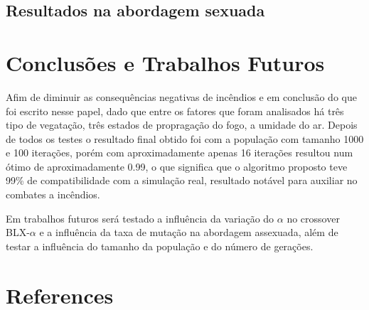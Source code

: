\documentclass[12pt]{article}
\begin{document}
\subsection{Resultados na abordagem sexuada}

\section{Conclusões e Trabalhos Futuros}
Afim de diminuir as consequências negativas de incêndios e em conclusão do que foi escrito nesse papel, dado que entre os fatores que foram analisados há três tipo de vegatação, três estados de propragação do fogo, a umidade do ar.
Depois de todos os testes o resultado final obtido foi com a população com tamanho 1000 e 100 iterações, porém com aproximadamente apenas 16 iterações resultou num ótimo de aproximadamente 0.99, o que significa que o algoritmo proposto teve 99\% de compatibilidade com a simulação real, resultado notável para auxiliar no combates a incêndios.


Em trabalhos futuros será testado a influência da variação do $\alpha$ no crossover BLX-$\alpha$ e a influência da taxa de mutação na abordagem assexuada, além de testar a influência do tamanho da população e do número de gerações.

\section{References}




\end{document}

